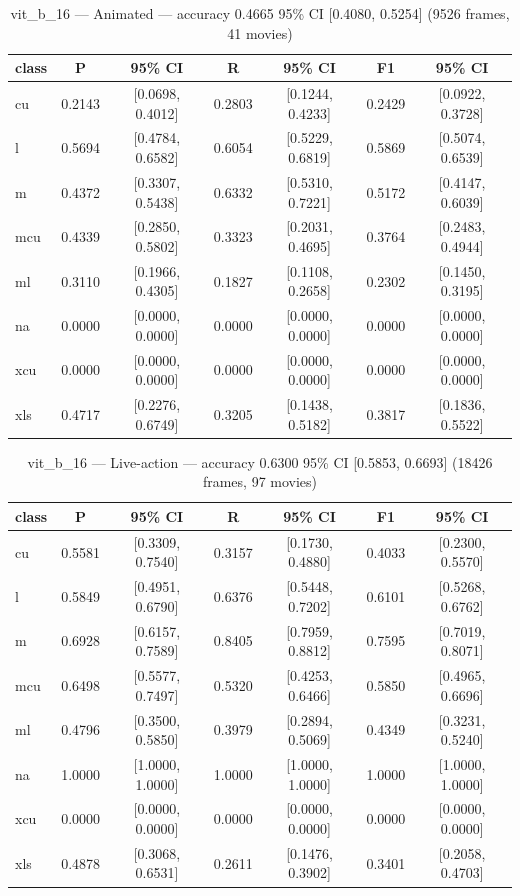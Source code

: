 \begin{table}[htbp]
\centering
\caption{vit\_b\_16 — Animated — accuracy 0.4665 95\% CI [0.4080, 0.5254] (9526 frames, 41 movies)}
\label{tab:vit-b-16-animated}
\begin{tabular}{lcccccc}
\toprule
class & P & 95\% CI & R & 95\% CI & F1 & 95\% CI \\
\midrule
cu & 0.2143 & [0.0698, 0.4012] & 0.2803 & [0.1244, 0.4233] & 0.2429 & [0.0922, 0.3728] \\
l & 0.5694 & [0.4784, 0.6582] & 0.6054 & [0.5229, 0.6819] & 0.5869 & [0.5074, 0.6539] \\
m & 0.4372 & [0.3307, 0.5438] & 0.6332 & [0.5310, 0.7221] & 0.5172 & [0.4147, 0.6039] \\
mcu & 0.4339 & [0.2850, 0.5802] & 0.3323 & [0.2031, 0.4695] & 0.3764 & [0.2483, 0.4944] \\
ml & 0.3110 & [0.1966, 0.4305] & 0.1827 & [0.1108, 0.2658] & 0.2302 & [0.1450, 0.3195] \\
na & 0.0000 & [0.0000, 0.0000] & 0.0000 & [0.0000, 0.0000] & 0.0000 & [0.0000, 0.0000] \\
xcu & 0.0000 & [0.0000, 0.0000] & 0.0000 & [0.0000, 0.0000] & 0.0000 & [0.0000, 0.0000] \\
xls & 0.4717 & [0.2276, 0.6749] & 0.3205 & [0.1438, 0.5182] & 0.3817 & [0.1836, 0.5522] \\
\bottomrule
\end{tabular}
\end{table}

\begin{table}[htbp]
\centering
\caption{vit\_b\_16 — Live-action — accuracy 0.6300 95\% CI [0.5853, 0.6693] (18426 frames, 97 movies)}
\label{tab:vit-b-16-live-action}
\begin{tabular}{lcccccc}
\toprule
class & P & 95\% CI & R & 95\% CI & F1 & 95\% CI \\
\midrule
cu & 0.5581 & [0.3309, 0.7540] & 0.3157 & [0.1730, 0.4880] & 0.4033 & [0.2300, 0.5570] \\
l & 0.5849 & [0.4951, 0.6790] & 0.6376 & [0.5448, 0.7202] & 0.6101 & [0.5268, 0.6762] \\
m & 0.6928 & [0.6157, 0.7589] & 0.8405 & [0.7959, 0.8812] & 0.7595 & [0.7019, 0.8071] \\
mcu & 0.6498 & [0.5577, 0.7497] & 0.5320 & [0.4253, 0.6466] & 0.5850 & [0.4965, 0.6696] \\
ml & 0.4796 & [0.3500, 0.5850] & 0.3979 & [0.2894, 0.5069] & 0.4349 & [0.3231, 0.5240] \\
na & 1.0000 & [1.0000, 1.0000] & 1.0000 & [1.0000, 1.0000] & 1.0000 & [1.0000, 1.0000] \\
xcu & 0.0000 & [0.0000, 0.0000] & 0.0000 & [0.0000, 0.0000] & 0.0000 & [0.0000, 0.0000] \\
xls & 0.4878 & [0.3068, 0.6531] & 0.2611 & [0.1476, 0.3902] & 0.3401 & [0.2058, 0.4703] \\
\bottomrule
\end{tabular}
\end{table}

